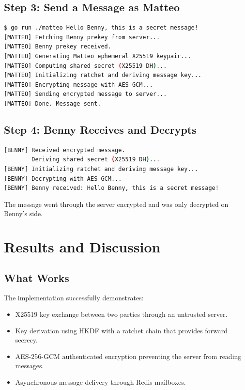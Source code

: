 \documentclass[12pt,a4paper]{article}
\begin{document}
\subsection{Step 3: Send a Message as Matteo}
\begin{lstlisting}[language=bash, caption={Matteo encrypts and sends a message.}]
$ go run ./matteo Hello Benny, this is a secret message!
[MATTEO] Fetching Benny prekey from server...
[MATTEO] Benny prekey received.
[MATTEO] Generating Matteo ephemeral X25519 keypair...
[MATTEO] Computing shared secret (X25519 DH)...
[MATTEO] Initializing ratchet and deriving message key...
[MATTEO] Encrypting message with AES-GCM...
[MATTEO] Sending encrypted message to server...
[MATTEO] Done. Message sent.
\end{lstlisting}

\subsection{Step 4: Benny Receives and Decrypts}
\begin{lstlisting}[language=bash, caption={Benny decrypts the message.}]
[BENNY] Received encrypted message.
        Deriving shared secret (X25519 DH)...
[BENNY] Initializing ratchet and deriving message key...
[BENNY] Decrypting with AES-GCM...
[BENNY] Benny received: Hello Benny, this is a secret message!
\end{lstlisting}

The message went through the server encrypted and was only decrypted on Benny's side.

\section{Results and Discussion}
\label{sec:discussion}

\subsection{What Works}
The implementation successfully demonstrates:
\begin{itemize}
    \item X25519 key exchange between two parties through an untrusted server.
    \item Key derivation using HKDF with a ratchet chain that provides forward secrecy.
    \item AES-256-GCM authenticated encryption preventing the server from reading messages.
    \item Asynchronous message delivery through Redis mailboxes.
\end{itemize}
\end{document}
